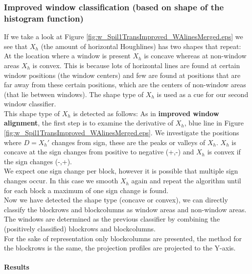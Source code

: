 \subsubsection{Improved window classification (based on shape of the histogram function)}
If we take a look at Figure \ref{fig:w_Spil1TransImproved_WAlinesMerged.eps}
we see that $X_h$ (the amount of horizontal Houghlines) has two shapes that
repeat:  At the location where a window is present $X_h$ is concave whereas at
non-window areas $X_h$ is convex. This is because lots of
horizontal lines are found at certain window positions (the window centers) and few
are found at positions that are far away from these certain positions, which are the
centers of non-window areas (that lie between windows).  The shape type of $X_h$ is
used as a cue for our second window classifier.\\

This shape type of $X_h$ is detected as follows:
As in \textbf{improved window alignment}, the first step is to examine the
derivative of $X_h$, blue line in Figure
\ref{fig:w_Spil1TransImproved_WAlinesMerged.eps}.  We investigate the positions
where $D=X_{h}'$ changes from sign, these are the peaks or valleys of $X_h$.
$X_h$ is concave at the sign changes from positive to negative (+,-) and $X_h$
is convex if the sign changes (-,+).\\

We expect one sign change per block, however it is possible that multiple sign
changes occur. In this case we smooth $X_h$ again and repeat the algorithm
until for each block a maximum of one sign change is found. \\

Now we have detected the shape type (concave or convex), we can directly
classify the blockrows and blockcolumns as window areas and non-window areas.
The windows are determined as the previous classifier by combining the
(positively classified) blockrows and blockcolumns.\\

For the sake of representation only blockcolumns are presented, the method for
the blockrows is the same, the projection profiles are projected to the
Y-axis.

\paragraph{Results} %


